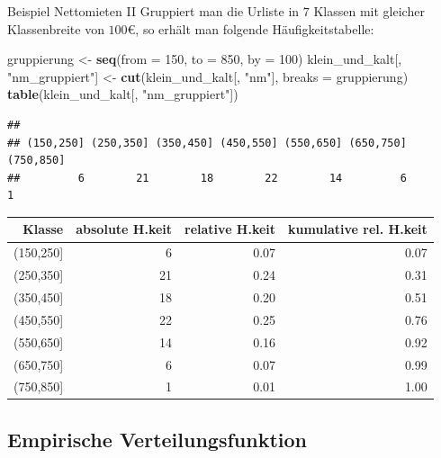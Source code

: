 \documentclass[
  10pt,
  ignorenonframetext,
]{beamer}
\newenvironment{Shaded}{\begin{snugshade}}{\end{snugshade}}
\newcommand{\AttributeTok}[1]{\textcolor[rgb]{0.13,0.29,0.53}{#1}}
\newcommand{\DecValTok}[1]{\textcolor[rgb]{0.00,0.00,0.81}{#1}}
\newcommand{\FunctionTok}[1]{\textcolor[rgb]{0.13,0.29,0.53}{\textbf{#1}}}
\newcommand{\NormalTok}[1]{#1}
\newcommand{\OtherTok}[1]{\textcolor[rgb]{0.56,0.35,0.01}{#1}}
\newcommand{\StringTok}[1]{\textcolor[rgb]{0.31,0.60,0.02}{#1}}
\begin{document}
\begin{frame}[fragile]{Beispiel Nettomieten II}
\protect\hypertarget{beispiel-nettomieten-ii}{}
Gruppiert man die Urliste in \(7\) Klassen mit gleicher Klassenbreite
von \(100\)€, so erhält man folgende Häufigkeitstabelle:

\scriptsize

\begin{Shaded}
\begin{Highlighting}[]
\NormalTok{gruppierung }\OtherTok{\textless{}{-}} \FunctionTok{seq}\NormalTok{(}\AttributeTok{from =} \DecValTok{150}\NormalTok{, }\AttributeTok{to =} \DecValTok{850}\NormalTok{, }\AttributeTok{by =} \DecValTok{100}\NormalTok{)}
\NormalTok{klein\_und\_kalt[, }\StringTok{"nm\_gruppiert"}\NormalTok{] }\OtherTok{\textless{}{-}} \FunctionTok{cut}\NormalTok{(klein\_und\_kalt[, }\StringTok{"nm"}\NormalTok{], }\AttributeTok{breaks =}\NormalTok{ gruppierung)}
\FunctionTok{table}\NormalTok{(klein\_und\_kalt[, }\StringTok{"nm\_gruppiert"}\NormalTok{])}
\end{Highlighting}
\end{Shaded}

\begin{verbatim}
## 
## (150,250] (250,350] (350,450] (450,550] (550,650] (650,750] (750,850] 
##         6        21        18        22        14         6         1
\end{verbatim}

\normalsize

\normalsize

\begin{table}[ht]
\centering
\begin{tabular}{rrrr}
 Klasse & absolute H.keit & relative H.keit & kumulative rel. H.keit \\ 
  \hline
(150,250] &   6 & 0.07 & 0.07 \\ 
  (250,350] &  21 & 0.24 & 0.31 \\ 
  (350,450] &  18 & 0.20 & 0.51 \\ 
  (450,550] &  22 & 0.25 & 0.76 \\ 
  (550,650] &  14 & 0.16 & 0.92 \\ 
  (650,750] &   6 & 0.07 & 0.99 \\ 
  (750,850] &   1 & 0.01 & 1.00 \\ 
  \end{tabular}
\end{table}
\normalsize
\end{frame}

\hypertarget{empirische-verteilungsfunktion}{%
\subsection{Empirische
Verteilungsfunktion}\label{empirische-verteilungsfunktion}}
\end{document}
